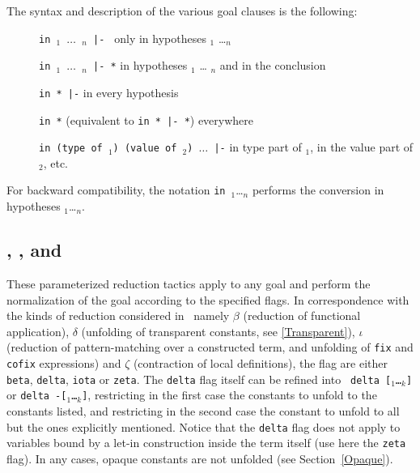 The syntax and description of the various goal clauses is the following:
\begin{description}
\item[]\texttt{in {\ident}$_1$ $\ldots$ {\ident}$_n$ |- } only in hypotheses {\ident}$_1$
  \ldots {\ident}$_n$
\item[]\texttt{in {\ident}$_1$ $\ldots$ {\ident}$_n$ |- *} in hypotheses {\ident}$_1$ \ldots
  {\ident}$_n$ and in the conclusion
\item[]\texttt{in * |-} in every hypothesis
\item[]\texttt{in *} (equivalent to \texttt{in * |- *}) everywhere
\item[]\texttt{in (type of {\ident}$_1$) (value of {\ident}$_2$) $\ldots$ |-} in
  type part of {\ident}$_1$, in the value part of {\ident}$_2$, etc.
\end{description}

For backward compatibility, the notation \texttt{in}~{\ident}$_1$\ldots {\ident}$_n$
performs the conversion in hypotheses {\ident}$_1$\ldots {\ident}$_n$.


\subsection{{}, {}, and {}}
\label{vmcompute}
\label{nativecompute}

These parameterized reduction tactics apply to any goal and perform
the normalization of the goal according to the specified flags. In
correspondence with the kinds of reduction considered in \Coq\, namely
$\beta$ (reduction of functional application), $\delta$ (unfolding of
transparent constants, see \ref{Transparent}), $\iota$ (reduction of
pattern-matching over a constructed term, and unfolding of {\tt fix}
and {\tt cofix} expressions) and $\zeta$ (contraction of local
definitions), the flag are either {\tt beta}, {\tt delta}, {\tt iota}
or {\tt zeta}. The {\tt delta} flag itself can be refined into {\tt
delta [\qualid$_1$\ldots\qualid$_k$]} or {\tt delta
-[\qualid$_1$\ldots\qualid$_k$]}, restricting in the first case the
constants to unfold to the constants listed, and restricting in the
second case the constant to unfold to all but the ones explicitly
mentioned. Notice that the {\tt delta} flag does not apply to
variables bound by a let-in construction inside the term itself (use
here the {\tt zeta} flag). In any cases, opaque constants are not
unfolded (see Section~\ref{Opaque}).

